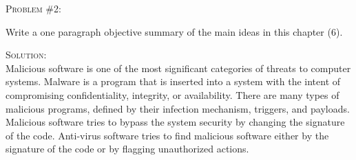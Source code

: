 \documentclass[12pt]{article}
\newenvironment{problem}[1]
{\begin{mdframed}[linewidth=0.8pt]
        \textsc{Problem #1:}

}
    {\end{mdframed}}
\newenvironment{solution}
    {\textsc{Solution:}\\}
    {\newpage}%
\begin{document}
	\begin{problem}{\#2}
		Write a one paragraph objective summary of the main ideas in this chapter (6).
	\end{problem}
	\begin{solution}
		Malicious software is one of the most significant categories of threats to computer systems. Malware is a program that is inserted into a system with the intent of compromising confidentiality, integrity, or availability. There are many types of malicious programs, defined by their infection mechanism, triggers, and payloads. Malicious software tries to bypass the system security by changing the signature of the code. Anti-virus software tries to find malicious software either by the signature of the code or by flagging unauthorized actions.
	\end{solution}
\end{document}
